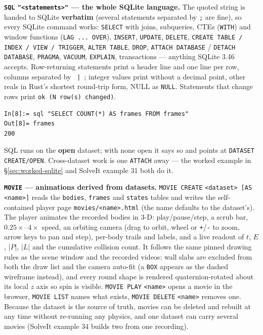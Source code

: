 \documentclass[11pt]{article}
\newcommand{\kw}[1]{\texttt{\uppercase{#1}}}
\newcommand{\code}[1]{\texttt{#1}}
\begin{document}
\textbf{\kw{sql} \code{"<statements>"} --- the whole SQLite language.}
The quoted string is handed to SQLite \textbf{verbatim} (several
statements separated by \code{;} are fine), so every SQLite command
works: \code{SELECT} with joins, subqueries, CTEs (\code{WITH}) and
window functions (\code{LAG ... OVER}), \code{INSERT}, \code{UPDATE},
\code{DELETE}, \code{CREATE TABLE / INDEX / VIEW / TRIGGER},
\code{ALTER TABLE}, \code{DROP}, \code{ATTACH DATABASE} /
\code{DETACH DATABASE}, \code{PRAGMA}, \code{VACUUM}, \code{EXPLAIN},
transactions --- anything SQLite 3.46 accepts. Row-returning
statements print a header line and one line per row, columns separated
by \code{ | }; integer values print without a decimal point, other
reals in Rust's shortest round-trip form, NULL as \code{NULL}.
Statements that change rows print \code{ok (N row(s) changed)}.

\begin{lstlisting}
In[8]:= sql "SELECT COUNT(*) AS frames FROM frames"
Out[8]= frames
200
\end{lstlisting}

SQL runs on the \textbf{open} dataset; with none open it says so and
points at \kw{dataset create/open}. Cross-dataset work is one
\code{ATTACH} away --- the worked example in
\S\ref{sec:worked-sqlite} and SolveIt example 31 both do it.

\textbf{\kw{movie} --- animations derived from datasets.}
\kw{movie create} \code{<dataset> [AS <name>]} reads the
\code{bodies}, \code{frames} and \code{states} tables and writes the
self-contained player page \code{movies/<name>.html} (the name
defaults to the dataset's). The player animates the recorded bodies in
3-D: play/pause/step, a scrub bar, $0.25\times$--$4\times$ speed, an
orbiting camera (drag to orbit, wheel or \code{+}/\code{-} to zoom,
arrow keys to pan and step), per-body trails and labels, and a live
readout of $t$, $E$, $|P|$, $|L|$ and the cumulative collision count.
It follows the same pinned drawing rules as the scene window and the
recorded videos: wall slabs are excluded from both the draw list and
the camera auto-fit (a \kw{box} appears as the dashed wireframe
instead), and every round shape is rendered quaternion-rotated about
its local $z$ axis so spin is visible. \kw{movie play} \code{<name>}
opens a movie in the browser, \kw{movie list} names what exists,
\kw{movie delete} \code{<name>} removes one. Because the dataset is
the source of truth, movies can be deleted and rebuilt at any time
without re-running any physics, and one dataset can carry several
movies (SolveIt example 34 builds two from one recording).
\end{document}

